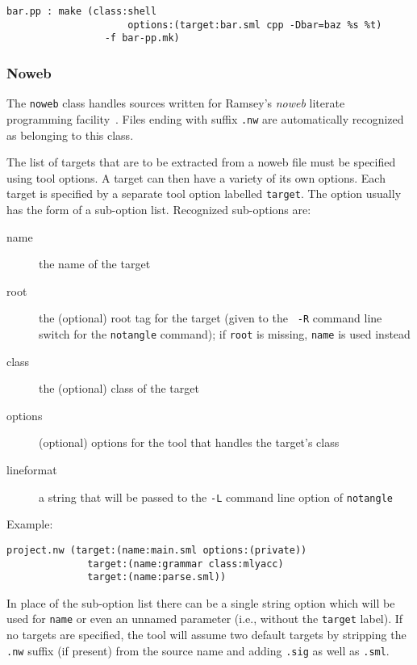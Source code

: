 \begin{lstlisting}[language=CM]
  bar.pp : make (class:shell
                     options:(target:bar.sml cpp -Dbar=baz %s %t)
                 -f bar-pp.mk)
\end{lstlisting}%

\subsubsection{Noweb}
\label{sec:builtin-tools:noweb}

The {\tt noweb} class handles sources written for Ramsey's {\it noweb}
literate programming facility~\cite{ramsey:simplified}.  Files ending
with suffix {\tt .nw} are automatically recognized as belonging to
this class.

The list of targets that are to be extracted from a noweb file must be
specified using tool options.  A target can then have a variety of its
own options.  Each target is specified by a separate tool option
labelled {\tt target}.  The option usually has the form of a
sub-option list.  Recognized sub-options are:

\begin{description}
\item[name] the name of the target
\item[root] the (optional) root tag for the target (given to the {\tt
-R} command line switch for the {\tt notangle} command); if {\tt root}
is missing, {\tt name} is used instead
\item[class] the (optional) class of the target
\item[options] (optional) options for the tool that handles the
target's class
\item[lineformat] a string that will be passed to the {\tt -L} command
line option of {\tt notangle}
\end{description}

Example:

\begin{lstlisting}[language=CM]
  project.nw (target:(name:main.sml options:(private))
              target:(name:grammar class:mlyacc)
              target:(name:parse.sml))
\end{lstlisting}%

In place of the sub-option list there can be a single string option
which will be used for {\tt name} or even an unnamed parameter (i.e.,
without the {\tt target} label).  If no targets are specified, the
tool will assume two default targets by stripping the {\tt .nw}
suffix (if present) from the source name and adding {\tt .sig} as well
as {\tt .sml}.

